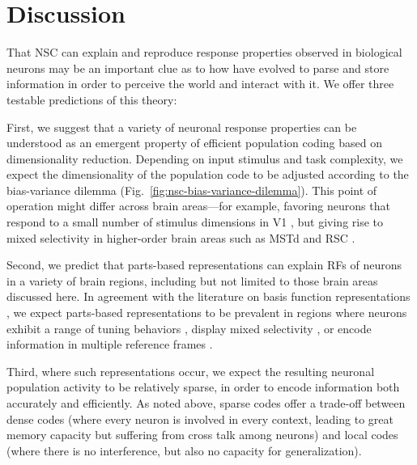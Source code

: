 \section*{Discussion}
\label{sec:discussion}

That \ac{NSC} can explain and reproduce response properties 
observed in biological neurons 
may be an important clue as to how 
have evolved to parse and store information
in order to perceive the world and interact with it.
We offer three testable predictions of this theory:

First, we suggest that a variety of neuronal response properties
can be understood as an emergent property of efficient population coding 
based on dimensionality reduction.
Depending on input stimulus and task complexity,
we expect the dimensionality of the population code to be adjusted
according to the bias-variance dilemma
(Fig.~\ref{fig:nsc-bias-variance-dilemma}).
This point of operation might differ across brain areas---for example,
favoring neurons that respond to a small number of stimulus dimensions
in \ac{V1} \cite{OlshausenField1996},
but giving rise to mixed selectivity in higher-order brain areas
such as \ac{MSTd} \cite{Beyeler2016} and
\ac{RSC} \cite{Rounds2016,Rounds2018}.

Second, we predict that parts-based representations can explain
\acp{RF} of neurons in a variety of brain regions,
including but not limited to those brain areas discussed here. 
In agreement with the literature on basis function representations
\cite{PougetSejnowski1997,PougetSnyder2000,Poggio1990},
we expect parts-based representations
to be prevalent in regions where neurons
exhibit a range of tuning behaviors \cite{Beyeler2016},
display mixed selectivity \cite{Fusi2016,Eichenbaum2017},
or encode information in multiple reference frames 
\cite{AlexanderNitz2015,Rounds2016,Rounds2018}.

Third, where such representations occur, we expect the resulting
neuronal population activity to be relatively sparse,
in order to encode information both accurately and efficiently.
As noted above, sparse codes offer a trade-off between 
dense codes (where every neuron is involved in every context,
leading to great memory capacity but suffering from cross talk among neurons)
and local codes (where there is no interference, 
but also no capacity for generalization).



